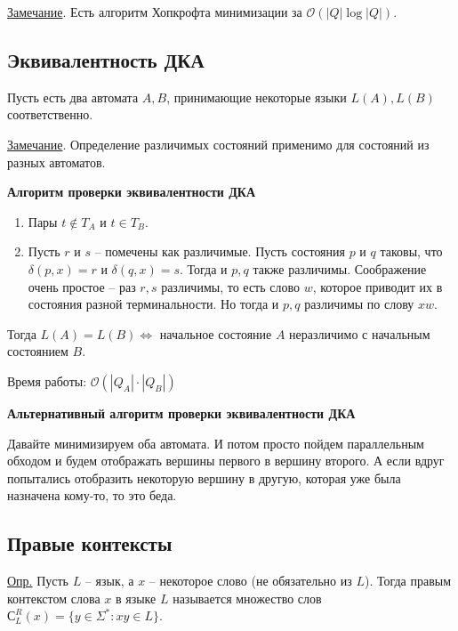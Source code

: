 \documentclass[fleqn, 12pt]{article}
\newcommand{\bigo}{\mathcal{O}}
\begin{document}
\underline{Замечание}. Есть алгоритм Хопкрофта минимизации за $ \bigo(|Q| \log |Q|) $.


\bigskip


\subsection{Эквивалентность ДКА}

Пусть есть два автомата $ A, B $, принимающие некоторые языки $ L(A), L(B) $ соответственно. 

\underline{Замечание}. Определение различимых состояний применимо для состояний из разных автоматов.

\textbf{Алгоритм проверки эквивалентности ДКА}

\begin{enumerate}
	\item Пары $ t \notin T_A $ и $ t \in T_B $. 
	
	\item Пусть $ r $ и $ s $ -- помечены как различимые. Пусть состояния $ p $ и $ q $ таковы, что $ \delta(p, x) = r $ и $ \delta(q, x) = s $. Тогда и $ p, q $ также различимы. Соображение очень простое -- раз $ r,s $ различимы, то есть слово $ w $, которое приводит их в состояния разной терминальности. Но тогда и $ p, q $ различимы по слову $ xw $.

\end{enumerate}

Тогда $ L(A) = L(B) \Leftrightarrow $ начальное состояние $ A $ неразличимо с начальным состоянием $ B $.

Время работы: $ \bigo(|Q_A| \cdot |Q_B|) $

\bigskip

\textbf{Альтернативный алгоритм проверки эквивалентности ДКА}

Давайте минимизируем оба автомата. И потом просто пойдем параллельным обходом и будем отображать вершины первого в вершину второго. А если вдруг попытались отобразить некоторую вершину в другую, которая уже была назначена кому-то, то это беда.


\bigskip


\subsection{Правые контексты}

\underline{Опр.} Пусть $ L $ -- язык, а $ x $ -- некоторое слово (не обязательно из $ L $). Тогда правым контекстом слова $ x $ в языке $ L $ называется множество слов $ С^R_L(x) = \{ y \in \Sigma^* \colon xy \in L\} $.
\end{document}
